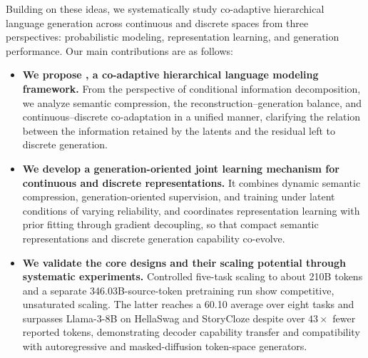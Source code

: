 Building on these ideas, we systematically study co-adaptive hierarchical language generation across continuous and discrete spaces from three perspectives: probabilistic modeling, representation learning, and generation performance. Our main contributions are as follows:
\begin{itemize}
    \item \textbf{We propose \method, a co-adaptive hierarchical language modeling framework.} From the perspective of conditional information decomposition, we analyze semantic compression, the reconstruction--generation balance, and continuous--discrete co-adaptation in a unified manner, clarifying the relation between the information retained by the latents and the residual left to discrete generation.
    \item \textbf{We develop a generation-oriented joint learning mechanism for continuous and discrete representations.} It combines dynamic semantic compression, generation-oriented supervision, and training under latent conditions of varying reliability, and coordinates representation learning with prior fitting through gradient decoupling, so that compact semantic representations and discrete generation capability co-evolve.
    \item \textbf{We validate the core designs and their scaling potential through systematic experiments.} Controlled five-task scaling to about 210B tokens and a separate 346.03B-source-token pretraining run show competitive, unsaturated scaling. The latter reaches a 60.10 average over eight tasks and surpasses Llama-3-8B on HellaSwag and StoryCloze despite over $43{\times}$ fewer reported tokens, demonstrating decoder capability transfer and compatibility with autoregressive and masked-diffusion token-space generators.
\end{itemize}
